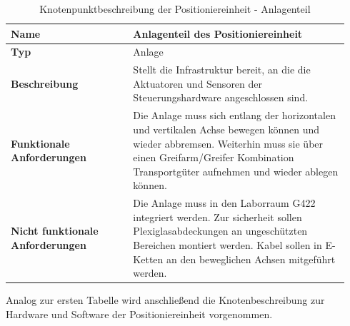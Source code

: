 \documentclass[../../../Bachelorarbeit.tex]{subfiles}
\begin{document}
\begin{table}[H]
    \centering
    \begin{tabular}{| p{0.34\linewidth} | p{0.6\linewidth} |}
        \hline
        \textbf{Name} & Anlagenteil des Positioniereinheit \\ \hline
        \textbf{Typ} & Anlage \\ \hline
        \textbf{Beschreibung} & Stellt die Infrastruktur bereit, an die die Aktuatoren und Sensoren der Steuerungshardware angeschlossen sind. \\ \hline
        \textbf{Funktionale Anforderungen} & Die Anlage muss sich entlang der horizontalen und vertikalen Achse bewegen können und wieder abbremsen. Weiterhin muss sie über einen Greifarm/Greifer Kombination Transportgüter aufnehmen und wieder ablegen können. \\ \hline
        \textbf{Nicht funktionale Anforderungen} & Die Anlage muss in den Laborraum G422 integriert werden. Zur sicherheit sollen Plexiglasabdeckungen an ungeschützten Bereichen montiert werden. Kabel sollen in E-Ketten an den beweglichen Achsen mitgeführt werden. \\ \hline
    \end{tabular}
    \caption[Knotenpunktbeschreibung - Anlagenteil]{Knotenpunktbeschreibung der Positioniereinheit - Anlagenteil}
    \label{tab:my-table50}
\end{table}

Analog zur ersten Tabelle wird anschließend die Knotenbeschreibung zur Hardware und Software der Positioniereinheit vorgenommen.
\end{document}
